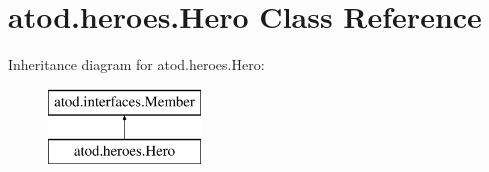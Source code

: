 \hypertarget{classatod_1_1heroes_1_1_hero}{}\section{atod.\+heroes.\+Hero Class Reference}
\label{classatod_1_1heroes_1_1_hero}
Inheritance diagram for atod.\+heroes.\+Hero\+:\begin{figure}[H]
\begin{center}
\leavevmode
\includegraphics[height=2.000000cm]{classatod_1_1heroes_1_1_hero}
\end{center}
\end{figure}
